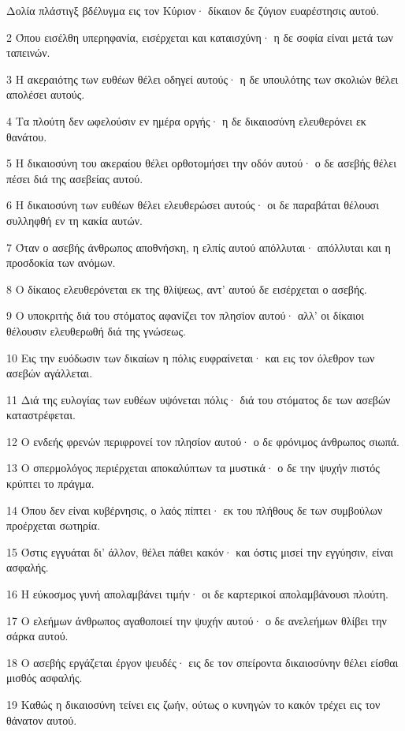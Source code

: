 \par Δολία πλάστιγξ βδέλυγμα εις τον Κύριον· δίκαιον δε ζύγιον ευαρέστησις αυτού.
\par 2 Όπου εισέλθη υπερηφανία, εισέρχεται και καταισχύνη· η δε σοφία είναι μετά των ταπεινών.
\par 3 Η ακεραιότης των ευθέων θέλει οδηγεί αυτούς· η δε υπουλότης των σκολιών θέλει απολέσει αυτούς.
\par 4 Τα πλούτη δεν ωφελούσιν εν ημέρα οργής· η δε δικαιοσύνη ελευθερόνει εκ θανάτου.
\par 5 Η δικαιοσύνη του ακεραίου θέλει ορθοτομήσει την οδόν αυτού· ο δε ασεβής θέλει πέσει διά της ασεβείας αυτού.
\par 6 Η δικαιοσύνη των ευθέων θέλει ελευθερώσει αυτούς· οι δε παραβάται θέλουσι συλληφθή εν τη κακία αυτών.
\par 7 Όταν ο ασεβής άνθρωπος αποθνήσκη, η ελπίς αυτού απόλλυται· απόλλυται και η προσδοκία των ανόμων.
\par 8 Ο δίκαιος ελευθερόνεται εκ της θλίψεως, αντ' αυτού δε εισέρχεται ο ασεβής.
\par 9 Ο υποκριτής διά του στόματος αφανίζει τον πλησίον αυτού· αλλ' οι δίκαιοι θέλουσιν ελευθερωθή διά της γνώσεως.
\par 10 Εις την ευόδωσιν των δικαίων η πόλις ευφραίνεται· και εις τον όλεθρον των ασεβών αγάλλεται.
\par 11 Διά της ευλογίας των ευθέων υψόνεται πόλις· διά του στόματος δε των ασεβών καταστρέφεται.
\par 12 Ο ενδεής φρενών περιφρονεί τον πλησίον αυτού· ο δε φρόνιμος άνθρωπος σιωπά.
\par 13 Ο σπερμολόγος περιέρχεται αποκαλύπτων τα μυστικά· ο δε την ψυχήν πιστός κρύπτει το πράγμα.
\par 14 Όπου δεν είναι κυβέρνησις, ο λαός πίπτει· εκ του πλήθους δε των συμβούλων προέρχεται σωτηρία.
\par 15 Όστις εγγυάται δι' άλλον, θέλει πάθει κακόν· και όστις μισεί την εγγύησιν, είναι ασφαλής.
\par 16 Η εύκοσμος γυνή απολαμβάνει τιμήν· οι δε καρτερικοί απολαμβάνουσι πλούτη.
\par 17 Ο ελεήμων άνθρωπος αγαθοποιεί την ψυχήν αυτού· ο δε ανελεήμων θλίβει την σάρκα αυτού.
\par 18 Ο ασεβής εργάζεται έργον ψευδές· εις δε τον σπείροντα δικαιοσύνην θέλει είσθαι μισθός ασφαλής.
\par 19 Καθώς η δικαιοσύνη τείνει εις ζωήν, ούτως ο κυνηγών το κακόν τρέχει εις τον θάνατον αυτού.
